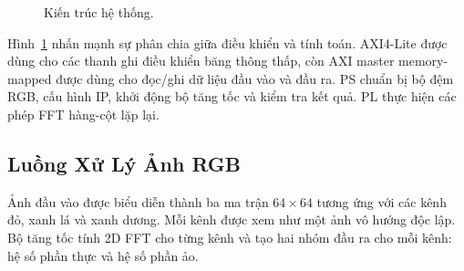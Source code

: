 ﻿\documentclass[conference]{IEEEtran}
\begin{document}
\begin{figure}[t]
{%
    }
    \caption{Kiến trúc hệ thống.}
    \label{fig:system_overview}
\end{figure}

Hình~\ref{fig:system_overview} nhấn mạnh sự phân chia giữa điều khiển và tính toán. AXI4-Lite được dùng cho các thanh ghi điều khiển băng thông thấp, còn AXI master memory-mapped được dùng cho đọc/ghi dữ liệu đầu vào và đầu ra. PS chuẩn bị bộ đệm RGB, cấu hình IP, khởi động bộ tăng tốc và kiểm tra kết quả. PL thực hiện các phép FFT hàng-cột lặp lại.

\subsection{Luồng Xử Lý Ảnh RGB}
Ảnh đầu vào được biểu diễn thành ba ma trận $64\times64$ tương ứng với các kênh đỏ, xanh lá và xanh dương. Mỗi kênh được xem như một ảnh vô hướng độc lập. Bộ tăng tốc tính 2D FFT cho từng kênh và tạo hai nhóm đầu ra cho mỗi kênh: hệ số phần thực và hệ số phần ảo.
\end{document}
